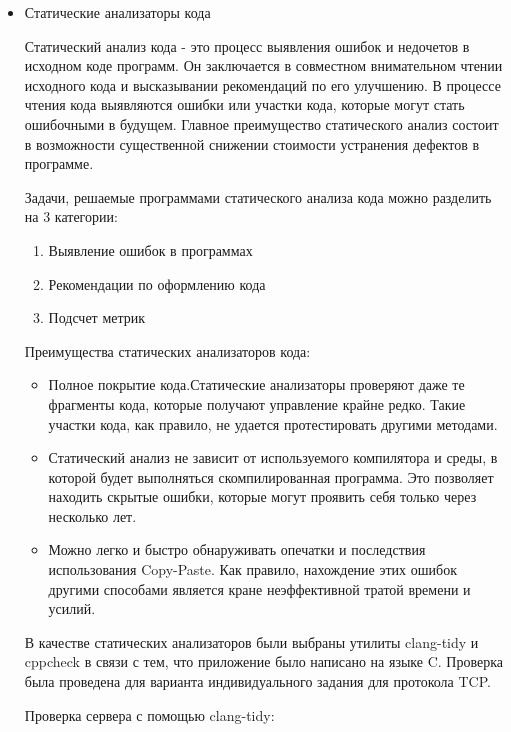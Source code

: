 \begin{itemize}
	\item Статические анализаторы кода

Статический анализ кода - это процесс выявления ошибок и недочетов в исходном коде программ. Он заключается в совместном внимательном чтении исходного кода и высказывании рекомендаций по его улучшению. В процессе чтения кода выявляются ошибки или участки кода, которые могут стать ошибочными в будущем. Главное преимущество статического анализ состоит в возможности существенной снижении стоимости устранения дефектов в программе. 

Задачи, решаемые программами статического анализа кода можно разделить на 3 категории:

\begin{enumerate}
	\item Выявление ошибок в программах
	\item Рекомендации по оформлению кода
	\item Подсчет метрик
\end{enumerate}

Преимущества статических анализаторов кода:

\begin{itemize}
	\item Полное покрытие кода.Статические анализаторы проверяют даже те фрагменты кода, которые получают управление крайне редко. Такие участки кода, как правило, не удается протестировать другими методами.
	\item Статический анализ не зависит от используемого компилятора и среды, в которой будет выполняться скомпилированная программа. Это позволяет находить скрытые ошибки, которые могут проявить себя только через несколько лет.
	\item Можно легко и быстро обнаруживать опечатки и последствия использования Copy-Paste. Как правило, нахождение этих ошибок другими способами является кране неэффективной тратой времени и усилий. 
\end{itemize}

В качестве статических анализаторов были выбраны утилиты clang-tidy и cppcheck в связи с тем, что приложение было написано на языке C. Проверка была проведена для варианта индивидуального задания для протокола TCP.

Проверка сервера с помощью clang-tidy:


\end{itemize}
